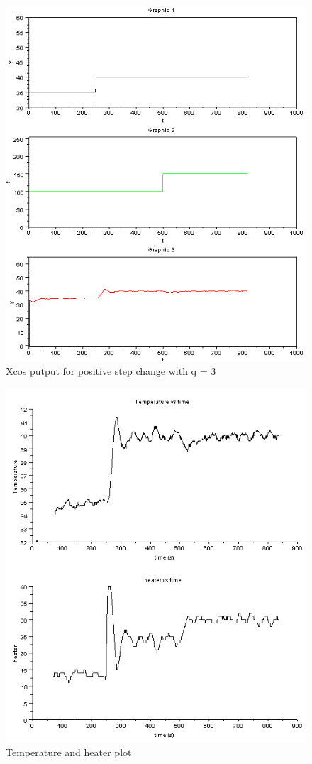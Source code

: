 \begin{figure}[H]
\centering
  \includegraphics[width=0.8\linewidth]{mpc/3_2.PNG}
  \caption{Xcos putput for positive step change with q = 3}
\end{figure}
\begin{figure}[H]
\centering
  \includegraphics[width=0.8\linewidth]{mpc/3_2_heater_final.png}
  \caption{Temperature and heater plot}
\end{figure}



